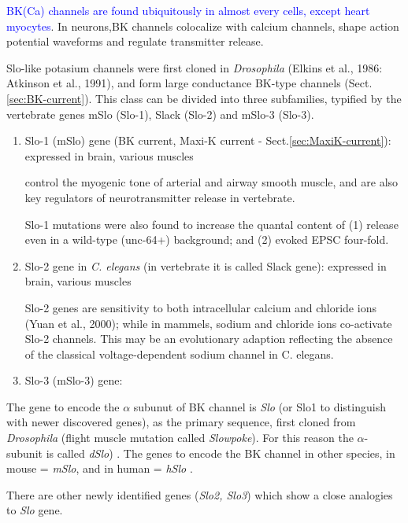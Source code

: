 \textcolor{blue}{BK(Ca) channels are found ubiquitously in almost every cells,
except heart myocytes}.
In neurons,BK channels colocalize with calcium channels, shape action potential
waveforms and regulate transmitter release.

\begin{mdframed}


Slo-like potasium channels were first cloned in {\it Drosophila} (Elkins et al.,
1986: Atkinson et al., 1991), and form large conductance BK-type channels
(Sect.\ref{sec:BK-current}).
This class can be divided into three subfamilies, typified by the vertebrate
genes mSlo (Slo-1), Slack (Slo-2) and mSlo-3 (Slo-3).
\begin{enumerate}
  \item Slo-1 (mSlo) gene (BK current, Maxi-K current -
  Sect.\ref{sec:MaxiK-current}):  expressed in brain, various muscles
  
  control the myogenic tone of arterial and airway smooth muscle, and are also
  key regulators of neurotransmitter release in vertebrate.
  
  Slo-1 mutations were also found to increase the quantal content of (1) release
  even in a wild-type (unc-64+) background; and (2) evoked EPSC four-fold. 
  
  \item Slo-2 gene in {\it C. elegans} (in vertebrate it is called Slack gene): 
  expressed in brain, various muscles
  
  Slo-2 genes are sensitivity to both intracellular calcium and chloride ions
  (Yuan et al., 2000); while in mammels, sodium and chloride ions co-activate
  Slo-2 channels. This may be an evolutionary adaption reflecting the absence of
  the classical voltage-dependent sodium channel in C. elegans. 
  
  \item Slo-3 (mSlo-3) gene: 
\end{enumerate}


\begin{mdframed}

The gene to encode the $\alpha$ subunut of BK channel is {\it Slo} (or Slo1 to
distinguish with newer discovered genes), as the primary sequence, first cloned from {\it Drosophila}
(flight muscle mutation called {\it Slowpoke}).
For this reason the $\alpha$-subunit is called {\it dSlo})
\citep{kaczorowski1996}. The genes to encode the BK channel in other species, in
mouse = {\it mSlo}, and in human = {\it hSlo} \citep{gribkoff2001}.

There are other newly identified genes ({\it Slo2, Slo3}) which show a close
analogies to {\it Slo} gene. 
\end{mdframed}

\end{mdframed}
 
